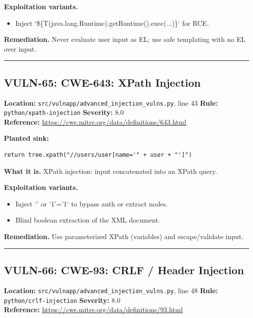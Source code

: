 \documentclass[11pt,a4paper]{article}
\begin{document}
\noindent\textbf{Exploitation variants.}
\begin{itemize}[leftmargin=1.4em,itemsep=1pt,topsep=2pt]
\item Inject `\$\{T(java.lang.Runtime).getRuntime().exec(...)\}` for RCE.
\end{itemize}
\noindent\textbf{Remediation.} Never evaluate user input as EL; use safe templating with no EL over input.

\vspace{4pt}\hrule\vspace{6pt}
\subsection{VULN-65: CWE-643: XPath Injection}
\noindent\textbf{Location:} \texttt{src/vulnapp/advanced\_injection\_vulns.py}, line 43 \quad \textbf{Rule:} \texttt{python/xpath-injection} \quad \textbf{Severity:} 8.0
\\ \textbf{Reference:} \url{https://cwe.mitre.org/data/definitions/643.html}

\noindent\textbf{Planted sink:}
\begin{lstlisting}
return tree.xpath("//users/user[name='" + user + "']")
\end{lstlisting}
\noindent\textbf{What it is.} XPath injection: input concatenated into an XPath query.

\noindent\textbf{Exploitation variants.}
\begin{itemize}[leftmargin=1.4em,itemsep=1pt,topsep=2pt]
\item Inject `' or '1'='1` to bypass auth or extract nodes.
\item Blind boolean extraction of the XML document.
\end{itemize}
\noindent\textbf{Remediation.} Use parameterized XPath (variables) and escape/validate input.

\vspace{4pt}\hrule\vspace{6pt}
\subsection{VULN-66: CWE-93: CRLF / Header Injection}
\noindent\textbf{Location:} \texttt{src/vulnapp/advanced\_injection\_vulns.py}, line 48 \quad \textbf{Rule:} \texttt{python/crlf-injection} \quad \textbf{Severity:} 8.0
\\ \textbf{Reference:} \url{https://cwe.mitre.org/data/definitions/93.html}
\end{document}
